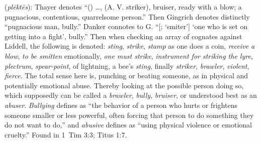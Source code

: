 \item[Abuser,]

(\textit{plēktēs}):
Thayer denotes ``() \ldots, (A. V. striker), bruiser, ready with a blow; a pugnacious, contentious, quarrelsome person.'' Then Gingrich denotes distinctly ``pugnacious man, bully.'' Danker connotes to G. ``[; `smiter'] `one who is set on getting into a fight', bully.'' Then when checking an array of cognates against Liddell, the following is denoted:  \emph{sting}, \emph{strike}, \emph{stamp} as one does a coin, \emph{receive a blow}, \emph{to be smitten} emotionally,  \emph{one must strike},  \emph{instrument for striking the lyre}, \emph{plectrum}, \emph{spear-point}, of  lightning, a bee's \emph{sting}, finally  \emph{striker}, \emph{brawler}, \emph{violent}, \emph{fierce}. The total sense here is, punching or beating someone, as in physical and potentially emotional abuse. Thereby looking at the possible person doing so, which supposedly can be called a \emph{brawler}, \emph{bully}, \emph{bruiser}, or understood best as an \emph{abuser}. \emph{Bullying} defines as ``the behavior of a person who hurts or frightens someone smaller or less powerful, often forcing that person to do something they do not want to do,'' and \emph{abusive} defines as ``using physical violence or emotional cruelty.''
Found in 1~Tim 3:3; Titus 1:7.
